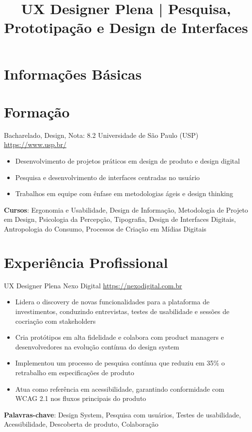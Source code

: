 \documentclass[a4paper, serif, 10pt]{moderncv}
\title{UX Designer Plena | Pesquisa, Prototipação e Design de Interfaces}
\begin{document}
\maketitle

\section{Informações Básicas}

\section{Formação}

        {Bacharelado, Design, Nota: 8.2}
        {Universidade de São Paulo (USP)}
        {\url{https://www.usp.br/}}
        {}
        {\begin{itemize}
\item Desenvolvimento de projetos práticos em design de produto e design digital
\item Pesquisa e desenvolvimento de interfaces centradas no usuário
\item Trabalhos em equipe com ênfase em metodologias ágeis e design thinking
\end{itemize}
\textbf{Cursos}: Ergonomia e Usabilidade, Design de Informação, Metodologia de Projeto em Design, Psicologia da Percepção, Tipografia, Design de Interfaces Digitais, Antropologia do Consumo, Processos de Criação em Mídias Digitais}
\section{Experiência Profissional}

        {UX Designer Plena}
        {Nexo Digital}
        {\url{https://nexodigital.com.br}}
        {}
        {\begin{itemize}
\item Lidera o discovery de novas funcionalidades para a plataforma de investimentos, conduzindo entrevistas, testes de usabilidade e sessões de cocriação com stakeholders
\item Cria protótipos em alta fidelidade e colabora com product managers e desenvolvedores na evolução contínua do design system
\item Implementou um processo de pesquisa contínua que reduziu em 35\% o retrabalho em especificações de produto
\item Atua como referência em acessibilidade, garantindo conformidade com WCAG 2.1 nos fluxos principais do produto
\end{itemize}
\textbf{Palavras-chave}: Design System, Pesquisa com usuários, Testes de usabilidade, Acessibilidade, Descoberta de produto, Colaboração}
\end{document}
